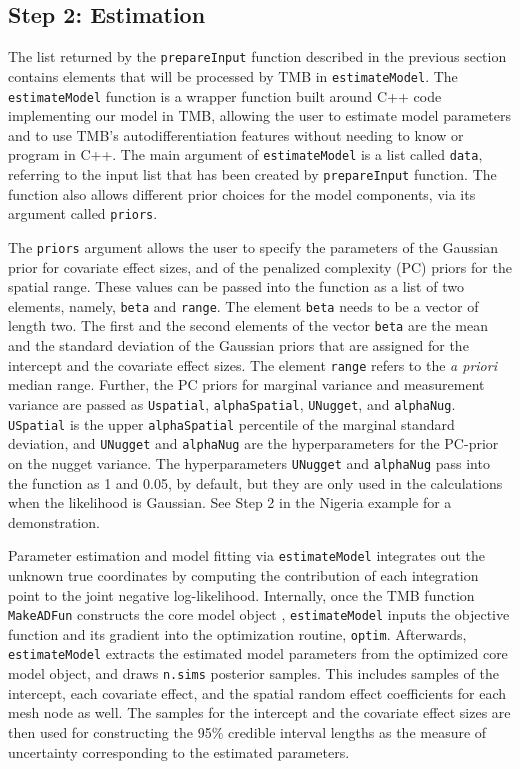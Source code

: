 \subsection{Step 2: Estimation}
The list returned by the \texttt{prepareInput} function described in the previous section contains elements that will be processed by TMB in \texttt{estimateModel}. 
The \texttt{estimateModel} function is a wrapper function built around C++ code implementing our model in TMB, allowing the user to estimate model parameters and to use TMB's autodifferentiation features without needing to know or program in C++. The main argument of \texttt{estimateModel} is a list called \texttt{data}, referring to the input list that has been created by \texttt{prepareInput} function. The function also allows different prior choices for the model components, via its argument called \texttt{priors}. 

The \texttt{priors} argument allows the user to specify the parameters of the Gaussian prior for covariate effect sizes, and of the penalized complexity (PC) priors for the spatial range. These values can be passed into the function as a list of two elements, namely, \texttt{beta} and \texttt{range}. 
The element \texttt{beta} needs to be a vector of length two. The first and the second elements of the vector \texttt{beta} are the mean and the standard deviation of the Gaussian priors that are assigned for the intercept and the covariate effect sizes. The element \texttt{range} refers to the \emph{a priori} median range. Further, the PC priors for marginal variance and measurement variance are passed as \texttt{Uspatial}, \texttt{alphaSpatial}, \texttt{UNugget}, and \texttt{alphaNug}. \texttt{USpatial} is the upper \texttt{alphaSpatial} percentile of the marginal standard deviation, and \texttt{UNugget} and \texttt{alphaNug} are the hyperparameters for the PC-prior on the nugget variance. The hyperparameters \texttt{UNugget} and \texttt{alphaNug} pass into the function as 1 and 0.05, by default, but they are only used in the calculations when the likelihood is Gaussian. 
See Step 2 in the Nigeria example for a demonstration.


Parameter estimation and model fitting via \texttt{estimateModel} integrates out the unknown true coordinates by computing the contribution of each integration point to the joint negative log-likelihood. 
Internally, once the TMB function \texttt{MakeADFun} constructs the core model object \citep{kaskr2022}, \texttt{estimateModel} inputs the objective function and its gradient into the optimization routine, \texttt{optim}. Afterwards, \texttt{estimateModel} extracts the estimated model parameters from the optimized core model object, and draws \texttt{n.sims} posterior samples. This includes samples of the intercept, each covariate effect, and the spatial random effect coefficients for each mesh node as well. The samples for the intercept and the covariate effect sizes are then used for constructing the 95\% credible interval lengths as the measure of uncertainty corresponding to the estimated parameters.

